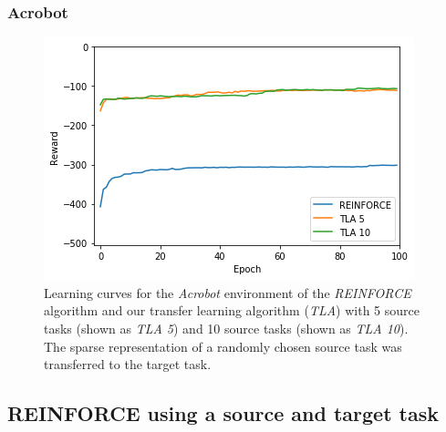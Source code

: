 \subsubsection{Acrobot} %
\label{ssub:with_sparse_representation_transfer:acrobot}
\begin{figure}[htb]
    \centering
    \includegraphics[width=.8\linewidth]{images/results/Acrobot/sparse_transfer/reward_target_re-akt5-akt10.png}
    \caption[Learning curves for the \textit{Acrobot} environment of \textit{REINFORCE} and \textit{TLA} using sparse representation transfer]{Learning curves for the \emph{Acrobot} environment of the \textit{REINFORCE} algorithm and our transfer learning algorithm (\textit{TLA}) with 5 source tasks (shown as \textit{TLA 5}) and 10 source tasks (shown as \textit{TLA 10}). The sparse representation of a randomly chosen source task was transferred to the target task.}
    \label{fig:Acrobot:st:reward_target_re-akt5-akt10}
\end{figure}

\subsection{REINFORCE using a source and target task} %
\label{sub:reinforce_using_a_source_and_target_task}
